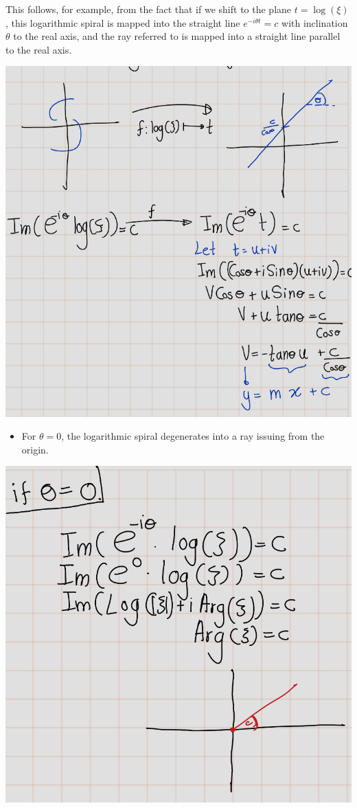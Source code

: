 \documentclass[
]{book}
\providecommand{\tightlist}{%
  \setlength{\itemsep}{0pt}\setlength{\parskip}{0pt}}
\theoremstyle{definition}
\theoremstyle{definition}
\theoremstyle{definition}
\theoremstyle{definition}
\theoremstyle{remark}
\begin{document}
This follows, for example, from the fact that if we shift to the plane \(t = \log(\xi)\), this logarithmic spiral is mapped into the straight line \(e^{-i\theta t} = c\) with inclination \(\theta\) to the real axis, and the ray referred to is mapped into a straight line parallel to the real axis.

\includegraphics[width=10.1in]{figures/Helical_Domain/fig1}

\begin{itemize}
\tightlist
\item
  For \(\theta = 0\), the logarithmic spiral degenerates into a ray issuing from the origin.
\end{itemize}

\begin{center}\includegraphics[width=10.6in]{figures/Helical_Domain/fig2} \end{center}
\end{document}

